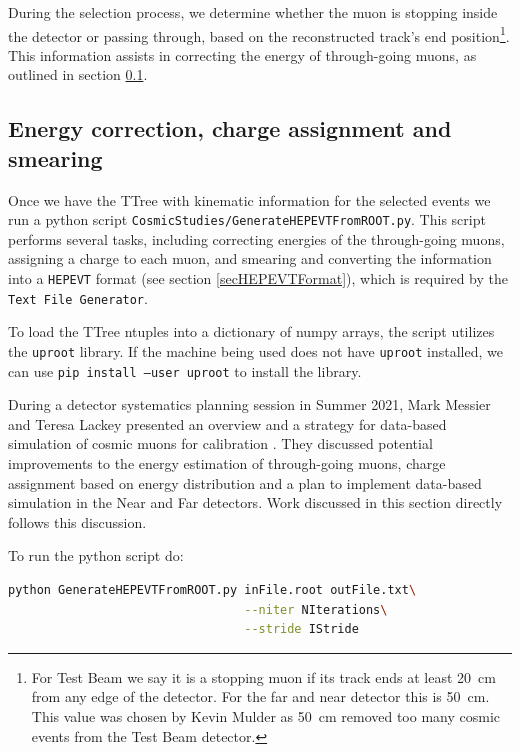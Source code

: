 \documentclass[12pt]{article}
\begin{document}
During the selection process, we determine whether the muon is stopping inside the detector or passing through, based on the reconstructed track's end position\footnote{For Test Beam we say it is a stopping muon if its track ends at least 20~cm from any edge of the detector. For the far and near detector this is 50~cm. This value was chosen by Kevin Mulder \cite{NOVA-doc-39244-v1} as 50~cm removed too many cosmic events from the Test Beam detector.}. This information assists in correcting the energy of through-going muons, as outlined in section \ref{secPython}.

\FloatBarrier
\subsection{Energy correction, charge assignment and smearing}\label{secPython}
Once we have the TTree with kinematic information for the selected events we run a python script \texttt{CosmicStudies/GenerateHEPEVTFromROOT.py}. This script performs several tasks, including correcting energies of the through-going muons, assigning a charge to each muon, and smearing and converting the information into a \texttt{HEPEVT} format (see section \ref{secHEPEVTFormat}), which is required by the \texttt{Text File Generator}.

To load the TTree ntuples into a dictionary of numpy arrays, the script utilizes the \texttt{uproot} library. If the machine being used does not have \texttt{uproot} installed, we can use \texttt{pip install --user uproot} to install the library.

During a detector systematics planning session in Summer 2021, Mark Messier and Teresa Lackey presented an overview and a strategy for data-based simulation of cosmic muons for calibration \cite{NOVA-doc-51327-v3}. They discussed potential improvements to the energy estimation of through-going muons, charge assignment based on energy distribution and a plan to implement data-based simulation in the Near and Far detectors. Work discussed in this section directly follows this discussion.

To run the python script do:
\begin{lstlisting}[frame=single,language=bash]
python GenerateHEPEVTFromROOT.py inFile.root outFile.txt\
                                 --niter NIterations\
                                 --stride IStride
\end{lstlisting}
\end{document}
